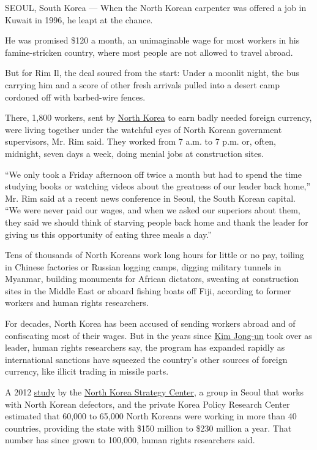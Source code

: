 SEOUL, South Korea --- When the North Korean carpenter was offered a job
in Kuwait in 1996, he leapt at the chance.

He was promised \$120 a month, an unimaginable wage for most workers in
his famine-stricken country, where most people are not allowed to travel
abroad.

But for Rim Il, the deal soured from the start: Under a moonlit night,
the bus carrying him and a score of other fresh arrivals pulled into a
desert camp cordoned off with barbed-wire fences.

There, 1,800 workers, sent by
\href{http://topics.nytimes3xbfgragh.onion/top/news/international/countriesandterritories/northkorea/index.html?inline=nyt-geo}{North
Korea} to earn badly needed foreign currency, were living together under
the watchful eyes of North Korean government supervisors, Mr. Rim said.
They worked from 7 a.m. to 7 p.m. or, often, midnight, seven days a
week, doing menial jobs at construction sites.

``We only took a Friday afternoon off twice a month but had to spend the
time studying books or watching videos about the greatness of our leader
back home,'' Mr. Rim said at a recent news conference in Seoul, the
South Korean capital. ``We were never paid our wages, and when we asked
our superiors about them, they said we should think of starving people
back home and thank the leader for giving us this opportunity of eating
three meals a day.''

Tens of thousands of North Koreans work long hours for little or no pay,
toiling in Chinese factories or Russian logging camps, digging military
tunnels in Myanmar, building monuments for African dictators, sweating
at construction sites in the Middle East or aboard fishing boats off
Fiji, according to former workers and human rights researchers.

For decades, North Korea has been accused of sending workers abroad and
of confiscating most of their wages. But in the years since
\href{http://topics.nytimes3xbfgragh.onion/top/reference/timestopics/people/k/kim_jongun/index.html?inline=nyt-per}{Kim
Jong-un} took over as leader, human rights researchers say, the program
has expanded rapidly as international sanctions have squeezed the
country's other sources of foreign currency, like illicit trading in
missile parts.

A 2012
\href{http://en.nksc.co.kr/our-work/research/reports/nksc-report-on-the-human-rights-conditions-of-overseas-north-korean-laborers/}{study}
by the \href{http://en.nksc.co.kr/}{North Korea Strategy Center}, a
group in Seoul that works with North Korean defectors, and the private
Korea Policy Research Center estimated that 60,000 to 65,000 North
Koreans were working in more than 40 countries, providing the state with
\$150 million to \$230 million a year. That number has since grown to
100,000, human rights researchers said.

